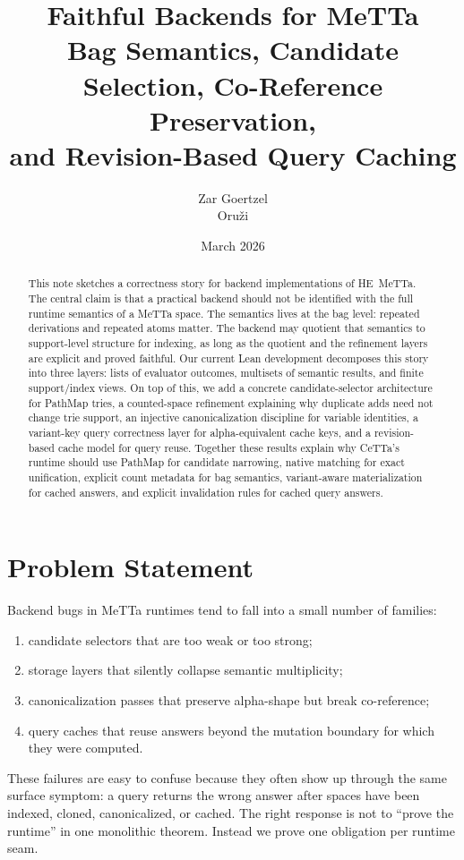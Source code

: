 \documentclass[11pt]{article}
\title{Faithful Backends for \HE{} MeTTa\\
\large Bag Semantics, Candidate Selection, Co-Reference Preservation,\\
and Revision-Based Query Caching}
\author{Zar Goertzel\\Oru\v{z}i}
\date{March 2026}
\newcommand{\HE}{\textup{HE}}
\newcommand{\CeTTa}{\textup{CeTTa}}
\newcommand{\PathMap}{\textup{PathMap}}
\begin{document}
\maketitle

\begin{abstract}
This note sketches a correctness story for backend implementations of
\HE{}~MeTTa.  The central claim is that a practical backend should not be
identified with the full runtime semantics of a MeTTa space.  The
semantics lives at the bag level: repeated derivations and repeated atoms
matter.  The backend may quotient that semantics to support-level
structure for indexing, as long as the quotient and the refinement layers
are explicit and proved faithful.
%
Our current Lean development decomposes this story into three layers:
lists of evaluator outcomes, multisets of semantic results, and finite
support/index views.  On top of this, we add a concrete candidate-selector
architecture for \PathMap{} tries, a counted-space refinement explaining
why duplicate adds need not change trie support, an injective
canonicalization discipline for variable identities, a variant-key query
correctness layer for alpha-equivalent cache keys, and a revision-based
cache model for query reuse.  Together these results explain why
\CeTTa{}'s runtime should use \PathMap{} for candidate narrowing,
native matching for exact unification, explicit count metadata for bag
semantics, variant-aware materialization for cached answers, and explicit
invalidation rules for cached query answers.
\end{abstract}

\section{Problem Statement}

Backend bugs in MeTTa runtimes tend to fall into a small number of
families:
\begin{enumerate}
\item candidate selectors that are too weak or too strong;
\item storage layers that silently collapse semantic multiplicity;
\item canonicalization passes that preserve alpha-shape but break
  co-reference;
\item query caches that reuse answers beyond the mutation boundary for
  which they were computed.
\end{enumerate}

These failures are easy to confuse because they often show up through the
same surface symptom: a query returns the wrong answer after spaces have
been indexed, cloned, canonicalized, or cached.  The right response is
not to ``prove the runtime'' in one monolithic theorem.  Instead we prove
one obligation per runtime seam.
\end{document}
